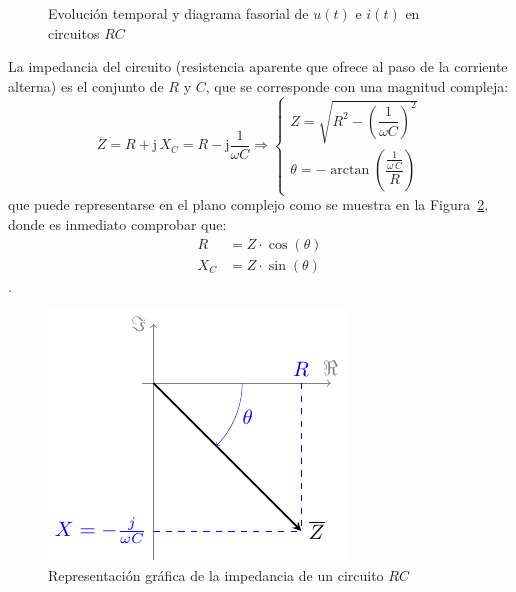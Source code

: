 \documentclass[11pt]{book} %
\begin{document}
	\begin{figure}[htbp]
		\centering
		\hfil
		\caption{Evolución temporal y diagrama fasorial de $u(t)$ e $i(t)$ en circuitos $RC$}
		\label{fig.fasorCapacitivoReal_VI}
	\end{figure}
	
	La impedancia del circuito (resistencia aparente que ofrece al paso de la corriente alterna) es el conjunto de $R$ y $C$, que se corresponde con una magnitud compleja: 
	\begin{equation}
		\boxed{ \overline{Z} = R + \mathrm{j}\,X_C = R- \mathrm{j}\dfrac{1}{\omega C} \Rightarrow 
			\begin{cases}
				Z=\sqrt{R^2-\left(\dfrac{1}{\omega C} \right)^2}\\
				\theta=-\arctan\left(\dfrac{\frac{1}{\omega\,C}}{R} \right)
		\end{cases}}
	\end{equation}
	que puede representarse en el plano complejo como se muestra en la Figura~\ref{fig.fasorcondensadorreal}, donde es inmediato comprobar que:
	\begin{align*}
		R&=Z\cdot\cos(\theta)\\
		X_C&=Z\cdot\sin(\theta)
	\end{align*}. 
	\begin{figure}[htbp]
		\centering
		\includegraphics{../figs/fasorCondensadorReal.pdf}
		\caption{Representación gráfica de la impedancia de un circuito $RC$}
		\label{fig.fasorcondensadorreal}
	\end{figure}
	
\end{document}
